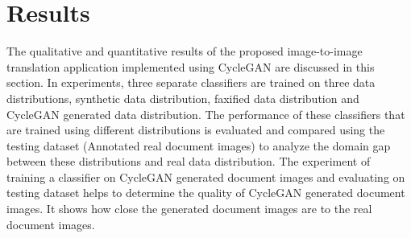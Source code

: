 \section{Results}\label{results}

The qualitative and quantitative results of the proposed image-to-image translation application implemented using \ac{CycleGAN} are discussed in this section. In experiments, three separate classifiers are trained on three data distributions, synthetic data distribution, faxified data distribution and \ac{CycleGAN} generated data distribution. The performance of these classifiers that are trained using different distributions is evaluated and compared using the testing dataset (Annotated real document images) to analyze the domain gap between these distributions and real data distribution. The experiment of training a classifier on \ac{CycleGAN} generated document images and evaluating on testing dataset helps to determine the quality of \ac{CycleGAN} generated document images. It shows how close the generated document images are to the real document images.

